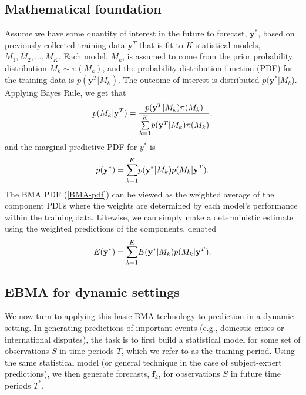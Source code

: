 \subsection{Mathematical foundation}

Assume we have some quantity of interest in the future to forecast,
$\mathbf{y}^*$, based on previously collected training data
$\mathbf{y}^T$ that is fit to $K$ statistical models, $M_1, M_2,
\ldots, M_K$. Each model, $M_k$, is assumed to come from the prior
probability distribution $M_k\sim \pi(M_k)$, and the probability
distribution function (PDF) for the training data is
$p(\mathbf{y}^T|M_k)$. The outcome of interest is distributed
$p(\mathbf{y}^*|M_k$).  Applying Bayes Rule, we get that
\begin{equation} \small
p(M_k|\mathbf{y}^T) = \frac{p(\mathbf{y}^T|M_k)\pi(M_k)}{\underset{k=1}{\overset{K}{\sum}}p(\mathbf{y}^T|M_k)\pi(M_k)}.
\end{equation}
\noindent and the marginal predictive PDF for $y^*$ is
\begin{equation}
\label{BMA-pdf}
\small
p(\mathbf{y}^*) = \underset{k=1}{\overset{K}{\sum}} p(\mathbf{y}^*|M_k)p(M_k|\mathbf{y}^T).
\end{equation}
The BMA PDF (\ref{BMA-pdf}) can be viewed as the weighted average of
the component PDFs where the weights are determined by each model's
performance within the training data.  Likewise, we can simply make a
deterministic estimate using the weighted predictions of the
components, denoted
\begin{equation} \small
E(\mathbf{y}^*) = \underset{k=1}{\overset{K}{\sum}} E(\mathbf{y}^*|M_k)p(M_k|\mathbf{y}^T).
\end{equation}

\subsection{EBMA for dynamic settings}

We now turn to applying this basic BMA technology to prediction in a
dynamic setting.  In generating predictions of important events (e.g.,
domestic crises or international disputes), the task is to first build
a statistical model for some set of observations $S$ in time periods
$T$, which we refer to as the training
period.  Using the same statistical model (or general
technique in the case of subject-expert predictions), we then generate
forecasts, $\mathbf{f}_k$, for observations $S$ in future time periods
$T^*$.

